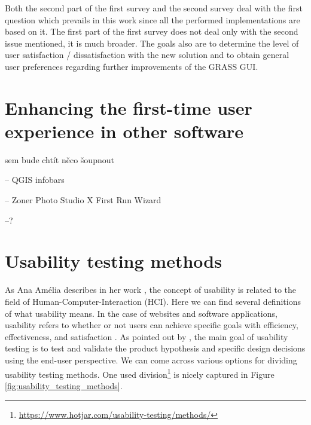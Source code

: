 \documentclass[a4paper,10pt,twoside]{article}
\begin{document}
\noindent Both the second part of the first survey and the second survey deal with the first question which prevails in this work since all the performed implementations are based on it. The first part of the first survey does not deal only with the second issue mentioned, it is much broader. The goals also are to determine the level of user satisfaction / dissatisfaction with the new solution and to obtain general user preferences regarding further improvements of the GRASS GUI.


\newpage
\vspace*{-1cm}
\section{Enhancing the first-time user experience in other software}
\label{sec:usability_testing}

sem bude chtít něco šoupnout

-- QGIS infobars

-- Zoner Photo Studio X First Run Wizard

--?

\newpage
\vspace*{-1cm}
\section{Usability testing methods}
\label{sec:usability_testing}

\noindent As Ana Amélia describes in her work \cite{amelia}, the concept of usability is related to the field of Human-Computer-Interaction (HCI). Here we can find several definitions of what usability means. In the case of websites and software applications, usability refers to whether or not users can achieve specific goals with efficiency, effectiveness, and satisfaction \cite{dishman}. As pointed out by \cite{hotjar}, the main goal of usability testing is to test and validate the product hypothesis and specific design decisions using the end-user perspective. We can come across various options for dividing usability testing methods. One used division\footnote{\url{https://www.hotjar.com/usability-testing/methods/}} is nicely captured in Figure \ref{fig:usability_testing_methods}.
\end{document}
